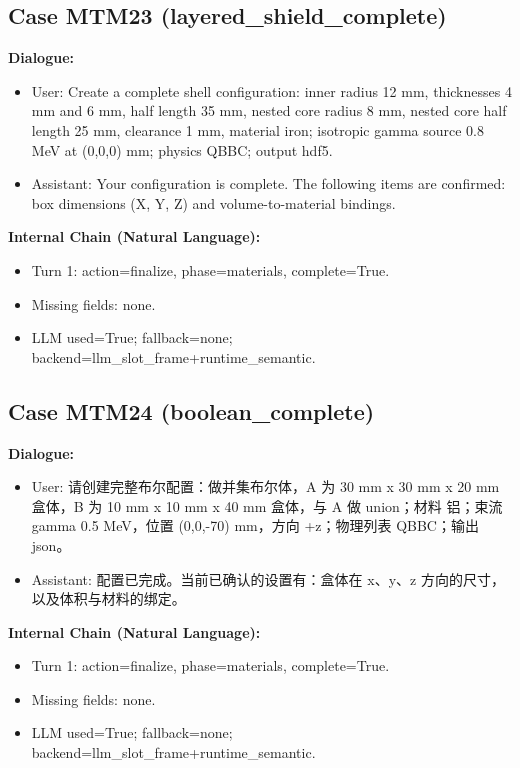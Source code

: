 \documentclass[11pt]{ctexart}
\begin{document}
\subsection{Case MTM23 (layered\_shield\_complete)}
\textbf{Dialogue:}
\begin{itemize}
\item User: Create a complete shell configuration: inner radius 12 mm, thicknesses 4 mm and 6 mm, half length 35 mm, nested core radius 8 mm, nested core half length 25 mm, clearance 1 mm, material iron; isotropic gamma source 0.8 MeV at (0,0,0) mm; physics QBBC; output hdf5.
\item Assistant: Your configuration is complete. The following items are confirmed: box dimensions (X, Y, Z) and volume-to-material bindings.
\end{itemize}
\textbf{Internal Chain (Natural Language):}
\begin{itemize}
\item Turn 1: action=finalize, phase=materials, complete=True.
\item Missing fields: none.
\item LLM used=True; fallback=none; backend=llm\_slot\_frame+runtime\_semantic.
\end{itemize}
\subsection{Case MTM24 (boolean\_complete)}
\textbf{Dialogue:}
\begin{itemize}
\item User: 请创建完整布尔配置：做并集布尔体，A 为 30 mm x 30 mm x 20 mm 盒体，B 为 10 mm x 10 mm x 40 mm 盒体，与 A 做 union；材料 铝；束流 gamma 0.5 MeV，位置 (0,0,-70) mm，方向 +z；物理列表 QBBC；输出 json。
\item Assistant: 配置已完成。当前已确认的设置有：盒体在 x、y、z 方向的尺寸，以及体积与材料的绑定。
\end{itemize}
\textbf{Internal Chain (Natural Language):}
\begin{itemize}
\item Turn 1: action=finalize, phase=materials, complete=True.
\item Missing fields: none.
\item LLM used=True; fallback=none; backend=llm\_slot\_frame+runtime\_semantic.
\end{itemize}
\end{document}

